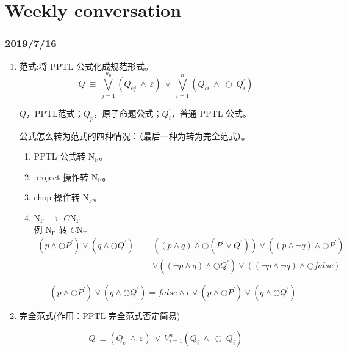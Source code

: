 \part{Weekly conversation}
\section{2019/7/16}

\begin{enumerate}
  \item 范式:将 PPTL 公式化成规范形式。\\
  $$Q~\equiv~\bigvee_{j=1}^{n_{0}}\left(Q_{ej}~\wedge~\varepsilon\right)~\vee~\bigvee_{i=1}^{n}\left(Q_{ci}~\wedge~\bigcirc~Q_{i}^{\prime}\right)$$

  $Q$，PPTL范式；$Q_p$，原子命题公式；$Q_i^{\prime}$，普通 PPTL 公式。

   公式怎么转为范式的四种情况：（最后一种为转为完全范式）。
  \begin{enumerate}[(1)]
    \item PPTL 公式转 $\mathrm{N}_{\mathrm{F}}$。
    \item project 操作转 $\mathrm{N}_{\mathrm{F}}$。
    \item chop 操作转 $\mathrm{N}_{\mathrm{F}}$。
    \item $\mathrm{N}_{\mathrm{F}}$ $\rightarrow$ $C\mathrm{N}_{\mathrm{F}}$\\
    例 $\mathrm{N}_{\mathrm{F}}$ 转 $C\mathrm{N}_{\mathrm{F}}$
    $$\begin{aligned}\left(p \wedge \bigcirc P^{\prime}\right) \vee\left(q \wedge \bigcirc Q^{\prime}\right) \equiv &\left((p \wedge q) \wedge \bigcirc\left(P^{\prime} \vee Q^{\prime}\right)\right) \vee\left((p \wedge \neg q) \wedge \bigcirc P^{\prime}\right) \\ & \vee\left((\neg p \wedge q) \wedge \bigcirc Q^{\prime}\right) \vee((\neg p \wedge \neg q) \wedge \bigcirc f a l s e) \end{aligned}$$

    $$\left(p \wedge \bigcirc P^{\prime}\right) \vee\left(q \wedge \bigcirc Q^{\prime}\right)=false \wedge  \epsilon \vee \left(p \wedge \bigcirc P^{\prime}\right) \vee\left(q \wedge \bigcirc Q^{\prime}\right)$$
  \end{enumerate}
  \item 完全范式(作用：PPTL 完全范式否定简易)

  $$Q~\equiv\left(Q_{e}~\wedge~\varepsilon\right)~\vee~V_{i=1}^{n}\left(Q_{i}~\wedge~\bigcirc~Q_{i}^{\prime}\right)$$


\end{enumerate}

